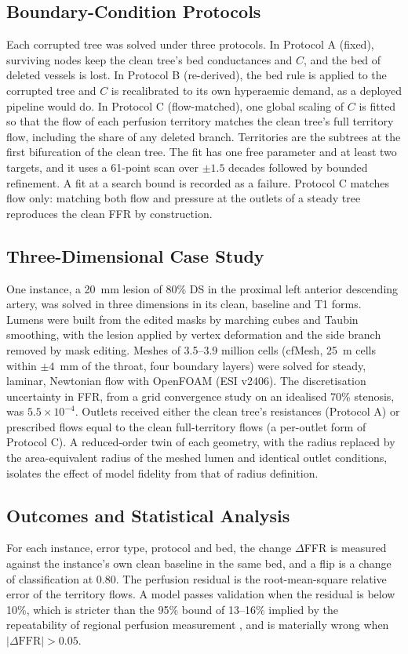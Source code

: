 \documentclass[journal]{IEEEtran}
\begin{document}
\subsection{Boundary-Condition Protocols}
Each corrupted tree was solved under three protocols. In Protocol A (fixed), surviving nodes keep the clean tree's
bed conductances and $C$, and the bed of deleted vessels is lost. In Protocol B (re-derived), the bed rule is applied
to the corrupted tree and $C$ is recalibrated to its own hyperaemic demand, as a deployed pipeline would do. In
Protocol C (flow-matched), one global scaling of $C$ is fitted so that the flow of each perfusion territory matches the
clean tree's full territory flow, including the share of any deleted branch. Territories are the subtrees at the
first bifurcation of the clean tree. The fit has one free parameter and at least two targets, and it uses a 61-point
scan over $\pm 1.5$ decades followed by bounded refinement. A fit at a search bound is recorded as a failure. Protocol
C matches flow only: matching both flow and pressure at the outlets of a steady tree reproduces the clean FFR by
construction.

\subsection{Three-Dimensional Case Study}
One instance, a 20~mm lesion of 80\% DS in the proximal left anterior descending artery, was solved in three
dimensions in its clean, baseline and T1 forms. Lumens were built from the edited masks by marching cubes and Taubin
smoothing, with the lesion applied by vertex deformation and the side branch removed by mask editing. Meshes of
3.5--3.9 million cells (cfMesh, 25~\textmu m cells within $\pm 4$~mm of the throat, four boundary layers) were solved
for steady, laminar, Newtonian flow with OpenFOAM (ESI v2406). The discretisation uncertainty in FFR, from a grid
convergence study on an idealised 70\% stenosis, was $5.5\times10^{-4}$. Outlets received either the clean tree's
resistances (Protocol A) or prescribed flows equal to the clean full-territory flows (a per-outlet form of
Protocol C). A reduced-order twin of each geometry, with the radius replaced by the area-equivalent radius of the
meshed lumen and identical outlet conditions, isolates the effect of model fidelity from that of radius definition.

\subsection{Outcomes and Statistical Analysis}
For each instance, error type, protocol and bed, the change $\Delta$FFR is measured against the instance's own clean
baseline in the same bed, and a flip is a change of classification at 0.80. The perfusion residual is the
root-mean-square relative error of the territory flows. A model passes validation when the residual is below 10\%,
which is stricter than the 95\% bound of 13--16\% implied by the repeatability of regional perfusion measurement
\cite{schindler2023,brown2018}, and
is materially wrong when $|\Delta\mathrm{FFR}| > 0.05$.
\end{document}
